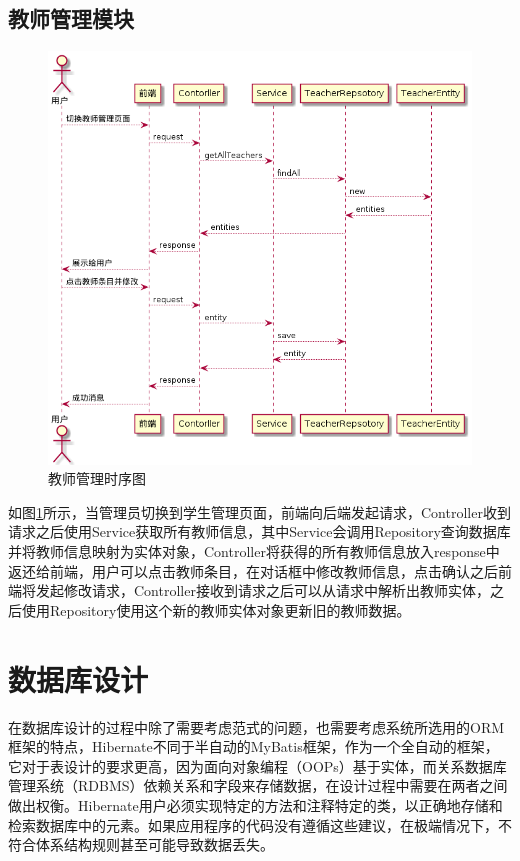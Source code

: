\subsection{教师管理模块}

\begin{figure}
    \centering
    \includegraphics[scale = 0.6]{out/uml/时序图/manage-teacher-sequence/manage-teacher-sequence.png}
    \caption{\song\wuhao 教师管理时序图}
    \label{manage-teacher-sequence}
\end{figure}

如图\ref{manage-teacher-sequence}所示，当管理员切换到学生管理页面，前端向后端发起请求，Controller收到请求之后使用Service获取所有教师信息，其中Service会调用Repository查询数据库并将教师信息映射为实体对象，Controller将获得的所有教师信息放入response中返还给前端，用户可以点击教师条目，在对话框中修改教师信息，点击确认之后前端将发起修改请求，Controller接收到请求之后可以从请求中解析出教师实体，之后使用Repository使用这个新的教师实体对象更新旧的教师数据。

\section{数据库设计}

在数据库设计的过程中除了需要考虑范式的问题，也需要考虑系统所选用的ORM框架的特点，Hibernate不同于半自动的MyBatis框架，作为一个全自动的框架，它对于表设计的要求更高，因为面向对象编程（OOPs）基于实体，而关系数据库管理系统（RDBMS）依赖关系和字段来存储数据\cite{Dhingra2017ReviewOJ}，在设计过程中需要在两者之间做出权衡。Hibernate用户必须实现特定的方法和注释特定的类，以正确地存储和检索数据库中的元素。如果应用程序的代码没有遵循这些建议，在极端情况下，不符合体系结构规则甚至可能导致数据丢失\cite{10.1145/3350768.3351796}。

